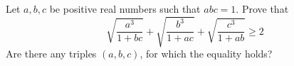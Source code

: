 Let $a,b,c$ be positive real numbers such that $abc=1$. Prove that$$\sqrt{\frac{a^3}{1+bc}}+\sqrt{\frac{b^3}{1+ac}}+\sqrt{\frac{c^3}{1+ab}}\geq 2$$Are there any triples $(a,b,c)$,  for which the equality holds?